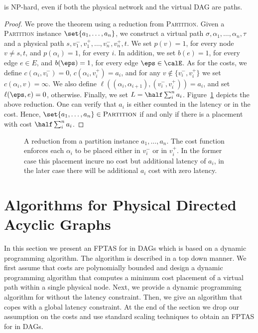\begin{theorem}
\scp is NP-hard, even if both the physical network and the virtual DAG
are paths.
\end{theorem}
\begin{proof}
We prove the theorem using a reduction from \textsc{Partition}.  Given
a \textsc{Partition} instance $\set{a_1, \ldots, a_n}$, we construct a
virtual path $\sigma, \alpha_1, \ldots, \alpha_n, \tau$ and a physical
path $s, v_1^-, v_1^+, \ldots, v_n^-, v_n^+, t$.  We set $p(v) = 1$,
for every node $v \neq s,t$, and $p(\alpha_i) = 1$, for every $i$.  In
addition, we set $b(e) = 1$, for every edge $e \in E$, and $b(\eps) =
1$, for every edge $\eps \in \calE$.
%
As for the costs, we define $c(\alpha_i, v_i^-) = 0$, $c(\alpha_i,
v_i^+) = a_i$, and for any $v \notin \{v_i^-,v_i^+\}$ we set
$c(\alpha_i, v) = \infty$.  We also define $\ell((\alpha_i,\alpha_{i+1}),
(v_i^-,v_i^+)) = a_i$, and set $\ell(\eps,e) = 0$, otherwise.  Finally,
we set $L = \half \sum_i^n a_i$.
%
Figure~\ref{fig:reduction2} depicts the above reduction.
%
One can verify that $a_i$ is either counted in the latency or in the
cost.  Hence, $\set{a_1, \ldots, a_n} \in \textsc{Partition}$ if and
only if there is a placement with cost $\half \sum_i^n a_i$.
\end{proof}


\begin{figure}[t]
\centering
{}
\caption[\scp{} - Hardness (paths)]{A reduction from a partition instance $a_1, \ldots, a_n$.
  The cost function enforces each $\alpha_i$ to be placed either in
  $v_i^-$ or in $v_i^+$.  In the former case this placement incure no
  cost but additional latency of $a_i$, in the later case there will
  be additional $a_i$ cost with zero latency.}
\label{fig:reduction2}
\end{figure}



\section{Algorithms for Physical Directed Acyclic Graphs}
\label{sec:algorithms}

In this section we present an FPTAS for \scp in DAGs which is based on
a dynamic programming algorithm.
%
The algorithm is described in a top down manner.  We first assume that
costs are polynomially bounded and design a dynamic programming
algorithm that computes a minimum cost placement of a virtual path
within a single physical node.  Next, we provide a dynamic programming
algorithm for \scp without the latency constraint.  Then, we give an
algorithm that copes with a global latency constraint.  At the end of
the section we drop our assumption on the costs and use standard
scaling techniques to obtain an FPTAS for \scp in DAGs.

